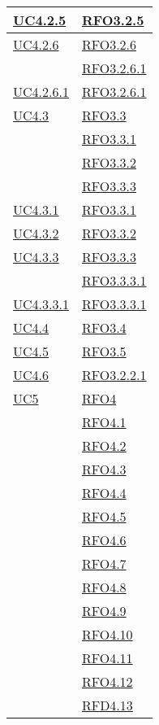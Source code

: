 \begin{longtable}{|>{\centering}m{5cm}|m{5cm}<{\centering}|}
\hyperref[UC4.2.5]{UC4.2.5} & \hyperlink{RFO3.2.5}{RFO3.2.5}\\ \hline
\hyperref[UC4.2.6]{UC4.2.6} & \hyperlink{RFO3.2.6}{RFO3.2.6}\\
& \hyperlink{RFO3.2.6.1}{RFO3.2.6.1}\\ \hline
\hyperref[UC4.2.6.1]{UC4.2.6.1} & \hyperlink{RFO3.2.6.1}{RFO3.2.6.1}\\ \hline
\hyperref[UC4.3]{UC4.3} & \hyperlink{RFO3.3}{RFO3.3}\\
& \hyperlink{RFO3.3.1}{RFO3.3.1}\\
& \hyperlink{RFO3.3.2}{RFO3.3.2}\\
& \hyperlink{RFO3.3.3}{RFO3.3.3}\\ \hline
\hyperref[UC4.3.1]{UC4.3.1} & \hyperlink{RFO3.3.1}{RFO3.3.1}\\ \hline
\hyperref[UC4.3.2]{UC4.3.2} & \hyperlink{RFO3.3.2}{RFO3.3.2}\\ \hline
\hyperref[UC4.3.3]{UC4.3.3} & \hyperlink{RFO3.3.3}{RFO3.3.3}\\
& \hyperlink{RFO3.3.3.1}{RFO3.3.3.1}\\ \hline
\hyperref[UC4.3.3.1]{UC4.3.3.1} & \hyperlink{RFO3.3.3.1}{RFO3.3.3.1}\\ \hline
\hyperref[UC4.4]{UC4.4} & \hyperlink{RFO3.4}{RFO3.4}\\ \hline
\hyperref[UC4.5]{UC4.5} & \hyperlink{RFO3.5}{RFO3.5}\\ \hline
\hyperref[UC4.6]{UC4.6} & \hyperlink{RFO3.2.2.1}{RFO3.2.2.1}\\ \hline
\hyperref[UC5]{UC5} & \hyperlink{RFO4}{RFO4}\\
& \hyperlink{RFO4.1}{RFO4.1}\\
& \hyperlink{RFO4.2}{RFO4.2}\\
& \hyperlink{RFO4.3}{RFO4.3}\\
& \hyperlink{RFO4.4}{RFO4.4}\\
& \hyperlink{RFO4.5}{RFO4.5}\\
& \hyperlink{RFO4.6}{RFO4.6}\\
& \hyperlink{RFO4.7}{RFO4.7}\\
& \hyperlink{RFO4.8}{RFO4.8}\\
& \hyperlink{RFO4.9}{RFO4.9}\\
& \hyperlink{RFO4.10}{RFO4.10}\\
& \hyperlink{RFO4.11}{RFO4.11}\\
& \hyperlink{RFO4.12}{RFO4.12}\\
& \hyperlink{RFD4.13}{RFD4.13}\\

\end{longtable}
